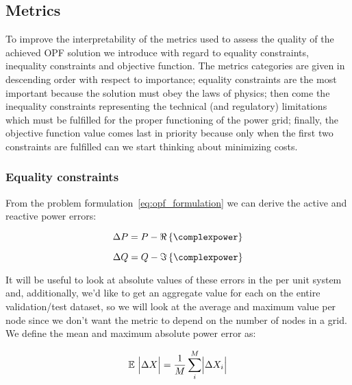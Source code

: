 \subsection*{Metrics}
To improve the interpretability of the metrics used to assess the quality of the achieved OPF solution
we introduce with regard to equality constraints, inequality constraints and objective function.
The metrics categories are given in descending order with respect to importance; equality constraints are
the most important because the solution must obey the laws of physics; then come the inequality constraints
representing the technical (and regulatory) limitations which must be fulfilled for the proper functioning
of the power grid; finally, the objective function value comes last in priority because only when the
first two constraints are fulfilled can we start thinking about minimizing costs.

\subsubsection*{Equality constraints}
From the problem formulation~\ref{eq:opf_formulation} we can derive the active and reactive power errors:

\begin{equation}
    \label{eq:active_power_error}
    \Delta P = P - \Re\left\{ \complexpower \right\}
\end{equation}

\begin{equation}
    \label{eq:reactive_power_error}
    \Delta Q = Q - \Im\left\{ \complexpower \right\}
\end{equation}

\noindent It will be useful to look at absolute values of these errors in the per unit system and, additionally, we'd like to get an aggregate value
for each on the entire validation/test dataset, so we will look at the average and maximum value
per node since we don't want the metric to depend on the number of nodes in a grid.
We define the mean and maximum absolute power error as:

\newcommand{\abs}[1]{\Bigl| #1 \Bigr|}

\newcommand{\expectedabsvalue}[1]{\mathbb{E} \ \abs{\Delta #1}}

\newcommand{\expectedrelativeabsvalue}[1]{\mathbb{E} \ \abs{\frac{\Delta #1}{#1}}}


\begin{equation}
    \label{eq:mean_absolute_power_error}
    \expectedabsvalue{X} = \frac{1}{M} \sum_i^{M} \abs{\Delta X_i}
\end{equation}

